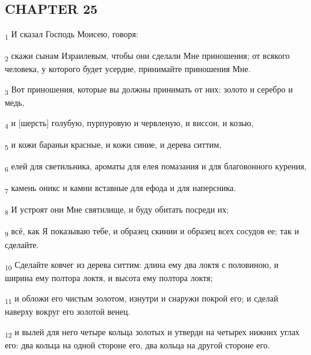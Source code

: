 \subsection{CHAPTER 25}
\begin{tcolorbox}
\textsubscript{1} И сказал Господь Моисею, говоря:
\end{tcolorbox}
\begin{tcolorbox}
\textsubscript{2} скажи сынам Израилевым, чтобы они сделали Мне приношения; от всякого человека, у которого будет усердие, принимайте приношения Мне.
\end{tcolorbox}
\begin{tcolorbox}
\textsubscript{3} Вот приношения, которые вы должны принимать от них: золото и серебро и медь,
\end{tcolorbox}
\begin{tcolorbox}
\textsubscript{4} и [шерсть] голубую, пурпуровую и червленую, и виссон, и козью,
\end{tcolorbox}
\begin{tcolorbox}
\textsubscript{5} и кожи бараньи красные, и кожи синие, и дерева ситтим,
\end{tcolorbox}
\begin{tcolorbox}
\textsubscript{6} елей для светильника, ароматы для елея помазания и для благовонного курения,
\end{tcolorbox}
\begin{tcolorbox}
\textsubscript{7} камень оникс и камни вставные для ефода и для наперсника.
\end{tcolorbox}
\begin{tcolorbox}
\textsubscript{8} И устроят они Мне святилище, и буду обитать посреди их;
\end{tcolorbox}
\begin{tcolorbox}
\textsubscript{9} всё, как Я показываю тебе, и образец скинии и образец всех сосудов ее; так и сделайте.
\end{tcolorbox}
\begin{tcolorbox}
\textsubscript{10} Сделайте ковчег из дерева ситтим: длина ему два локтя с половиною, и ширина ему полтора локтя, и высота ему полтора локтя;
\end{tcolorbox}
\begin{tcolorbox}
\textsubscript{11} и обложи его чистым золотом, изнутри и снаружи покрой его; и сделай наверху вокруг его золотой венец.
\end{tcolorbox}
\begin{tcolorbox}
\textsubscript{12} и вылей для него четыре кольца золотых и утверди на четырех нижних углах его: два кольца на одной стороне его, два кольца на другой стороне его.
\end{tcolorbox}
